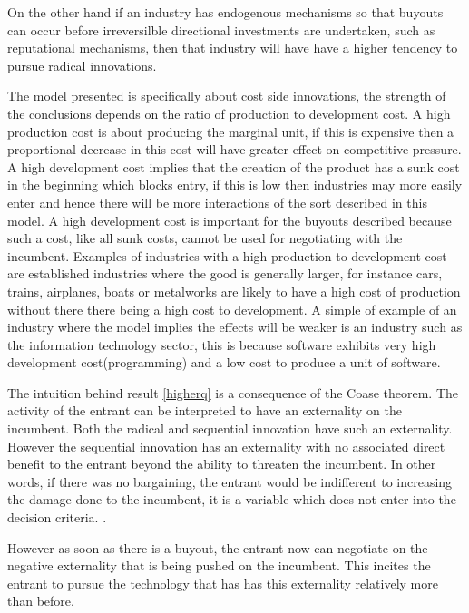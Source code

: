 \documentclass[11pt]{article}
\begin{document}
On the other hand if an industry has endogenous mechanisms so that buyouts can occur before irreversilble directional investments are undertaken, such as reputational mechanisms, then that industry will have have a higher tendency to pursue radical innovations. 

The model presented is specifically about cost side innovations, the strength of the conclusions depends on the ratio of production to development cost. A high production cost is about producing the marginal unit, if this is expensive then a proportional decrease in this cost will have greater effect on competitive pressure. A high development cost implies that the creation of the product has a sunk cost in the beginning which blocks entry, if this is low then industries may more easily enter and hence there will be more interactions of the sort described in this model. A high development cost is important for the buyouts described because such a cost, like all sunk costs, cannot be used for negotiating with the incumbent. Examples of industries with a high production to development cost are established industries where the good is generally larger, for instance cars, trains, airplanes, boats or metalworks are likely to have a high cost of production without there there being a high cost to development. A simple of example of an industry where the model implies the effects will be weaker is an industry such as the information technology sector, this is because software exhibits very high development cost(programming) and a low cost to produce a unit of software.  

The intuition behind result \ref{higherq} is a consequence of the Coase theorem. The activity of the entrant can be interpreted to have an externality on the incumbent. Both the radical and sequential innovation have such an externality. However the sequential innovation has an externality with no associated direct benefit to the entrant beyond the ability to threaten the incumbent. In other words, if there was no bargaining, the entrant would be indifferent to increasing the damage done to the incumbent, it is a variable which does not enter into the decision criteria. .

However as soon as there is a buyout, the entrant now can negotiate on the negative externality that is being pushed on the incumbent. This incites the entrant to pursue the technology that has has this externality relatively more than before. 
\end{document}
